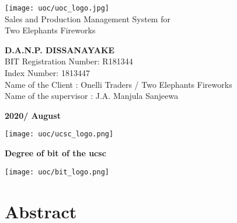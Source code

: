 \documentclass[12pt]{report}
\begin{document}
\onehalfspacing

\setlength{\parindent}{3em} %
\setlength{\parskip}{1em} %

\thispagestyle{empty}
\begin{titlepage}
	\begin{center}
		\vspace*{2cm}
		\texttt{[image: uoc/uoc\_logo.jpg]}\\
		\vspace{1cm}
		{\LARGE Sales and Production Management System for \\Two Elephants Fireworks}
		\vspace{2cm}
		\begin{large}

			\textbf{D.A.N.P. DISSANAYAKE}\\
			\vspace{2cm}
			BIT Registration Number: R181344 \\
			Index Number: 1813447 \\
			Name of the Client :  Onelli Traders / Two Elephants Fireworks \\
			Name of the supervisor :  J.A. Manjula Sanjeewa \\

			\vspace{1cm}

			\bf{2020/ August}

			\vspace{2.5cm}

			\vfill


			\texttt{[image: uoc/ucsc\_logo.png]}%
			\begin{minipage}[b]{0.7\textwidth}
				\centering
				{\small \bf Degree of \acrlong{bit} of the \acrlong{ucsc}}
			\end{minipage}%
			\texttt{[image: uoc/bit\_logo.png]}
		\end{large}
	\end{center}
\end{titlepage}


\newpage
\thispagestyle{plain}
\setcounter{page}{2}
\chapter*{\Huge Abstract}
\end{document}
